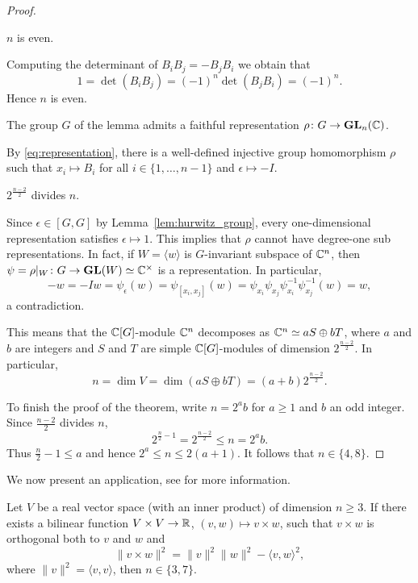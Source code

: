 \begin{proof}
    \begin{claim}
        $n$ is even. 
    \end{claim}
    
	Computing the determinant of 
	$B_iB_j=-B_jB_i$ we obtain that 
	\[
	1=\det(B_iB_j)=(-1)^n\det(B_jB_i)=(-1)^n.
	\]
	Hence $n$ is even. 

	\begin{claim}
	    The group 
	    $G$ of the lemma admits a faithful
	    representation $\rho\colon G\to\mathbf{GL}_n(\mathbb{C})$. 
	\end{claim}
	
	By \eqref{eq:representation}, there is a well-defined 
	injective group homomorphism $\rho$ such that 
	$x_i\mapsto B_i$ for all $i\in\{1,\dots,n-1\}$ and 
	$\epsilon\mapsto -I$. 
	
	\begin{claim}
	    $2^{\frac{n-2}{2}}$ divides $n$.
	\end{claim}
	
	Since $\epsilon\in[G,G]$ by Lemma~\ref{lem:hurwitz_group}, 
	every one-dimensional representation satisfies $\epsilon\mapsto 1$.
	This implies that $\rho$ cannot have degree-one sub representations. 
	In fact, 
	if $W=\langle w\rangle$ is $G$-invariant subspace of $\mathbb{C}^n$, 
	then $\psi=\rho|_W\colon G\to\mathbf{GL}(W)\simeq\mathbb{C}^\times$ 
	is a representation. In particular, 
	\[
	-w=-Iw=\psi_{\epsilon}(w)=\psi_{[x_i,x_j]}(w)
	=\psi_{x_i}\psi_{x_j}\psi_{{x_i}}^{-1}\psi_{{x_j}}^{-1}(w)=w, 
	\]
	a contradiction. 
	
	This means that the $\mathbb{C}[G]$-module $\mathbb{C}^n$ 
	decomposes as $\mathbb{C}^n\simeq aS\oplus bT$,
	where $a$ and $b$ are integers and 
	$S$ and $T$ are simple $\mathbb{C}[G]$-modules of dimension
	$2^{\frac{n-2}{2}}$. In particular, 
	\[
	n=\dim V=\dim(aS\oplus bT)=(a+b)2^{\frac{n-2}{2}}.
	\]
	
	To finish the proof of the theorem, write $n=2^ab$ 
	for $a\geq1$ and $b$ an odd integer. 
	Since $\frac{n-2}{2}$ divides $n$, 
	\[
	2^{\frac{n}{2}-1}=2^{\frac{n-2}{2}}\leq n=2^ab. 
	\]
	Thus $\frac{n}{2}-1\leq a$ and hence $2^a\leq n\leq 2(a+1)$. 
	It follows that $n\in\{4,8\}$.  
\end{proof}

We now present an application, see
\cite{MR1534187} for more information. 

\begin{theorem}
	Let $V$ be a real vector space (with an inner product) 
	of dimension $n\geq3$. If there exists a bilinear function 
	$V\times V\to\mathbb{R}$, $(v,w)\mapsto v\times
	w$, such that $v\times w$ is orthogonal both 
	to $v$ and $w$ and 
	\[
		\|v\times w\|^2=\|v\|^2\|w\|^2-\langle v,w\rangle^2,
	\]
	where $\|v\|^2=\langle v,v\rangle$, then $n\in\{3,7\}$. 
\end{theorem}

